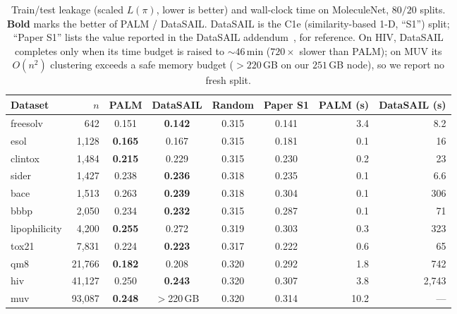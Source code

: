 \documentclass{article}
\begin{document}
\begin{table}[!ht]
  \caption{Train/test leakage (scaled $L(\pi)$, lower is better) and wall-clock
  time on MoleculeNet, $80/20$ splits. \textbf{Bold} marks the better of
  PALM / DataSAIL. DataSAIL is the C1e (similarity-based 1-D, ``S1'') split;
  ``Paper S1'' lists the value reported in the DataSAIL addendum~\cite{joeres2025addendum}, for reference.
  On HIV, DataSAIL completes only when its time budget is raised to $\sim$$46$\,min
  ($720\times$ slower than PALM); on MUV its $O(n^2)$ clustering exceeds a safe
  memory budget ($>$$220$\,GB on our $251$\,GB node), so we report no fresh split.}
  \label{tab:benchmark}
  \centering
  \small
  \renewcommand{\arraystretch}{1.1}
  \begin{tabular}{lrccccrr}
    \toprule
    Dataset & $n$ & \textbf{PALM} & DataSAIL & Random & Paper S1 & PALM (s) & DataSAIL (s) \\
    \midrule
    freesolv      & 642    & 0.151          & \textbf{0.142} & 0.315 & 0.141 & 3.4  & 8.2  \\
    esol          & 1{,}128 & \textbf{0.165} & 0.167          & 0.315 & 0.181 & 0.1  & 16   \\
    clintox       & 1{,}484 & \textbf{0.215} & 0.229          & 0.315 & 0.230 & 0.2  & 23   \\
    sider         & 1{,}427 & 0.238          & \textbf{0.236} & 0.318 & 0.235 & 0.1  & 6.6  \\
    bace          & 1{,}513 & 0.263          & \textbf{0.239} & 0.318 & 0.304 & 0.1  & 306  \\
    bbbp          & 2{,}050 & 0.234          & \textbf{0.232} & 0.315 & 0.287 & 0.1  & 71   \\
    lipophilicity & 4{,}200 & \textbf{0.255} & 0.272          & 0.319 & 0.303 & 0.3  & 323  \\
    tox21         & 7{,}831 & 0.224          & \textbf{0.223} & 0.317 & 0.222 & 0.6  & 65   \\
    qm8           & 21{,}766 & \textbf{0.182} & 0.208         & 0.320 & 0.292 & 1.8  & 742  \\
    hiv           & 41{,}127 & 0.250          & \textbf{0.243} & 0.320 & 0.307 & 3.8  & 2{,}743 \\
    muv           & 93{,}087 & \textbf{0.248} & $>$220\,GB     & 0.320 & 0.314 & 10.2 & ---  \\
    \bottomrule
  \end{tabular}
\end{table}
\end{document}
